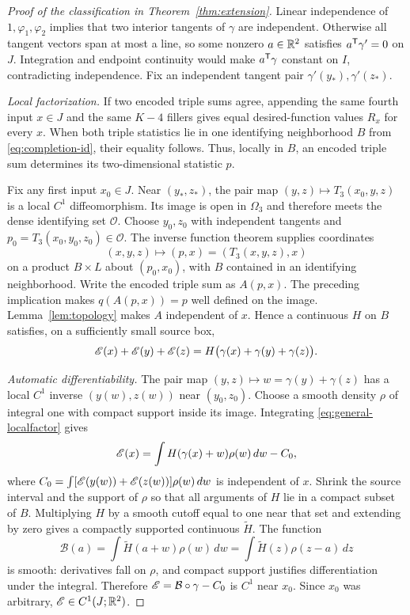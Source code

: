 \begin{proof}[Proof of the classification in Theorem~\ref{thm:extension}]
Linear independence of $1,\varphi_1,\varphi_2$ implies that two interior tangents of $\gamma$ are independent. Otherwise all tangent vectors span at most a line, so some nonzero $a\in\mathbb R^2$ satisfies $a^\mathsf T\gamma'=0$ on $J$. Integration and endpoint continuity would make $a^\mathsf T\gamma$ constant on $I$, contradicting independence. Fix an independent tangent pair $\gamma'(y_*),\gamma'(z_*)$.

\emph{Local factorization.} If two encoded triple sums agree, appending the same fourth input $x\in J$ and the same $K-4$ fillers gives equal desired-function values $R_x$ for every $x$. When both triple statistics lie in one identifying neighborhood $B$ from \eqref{eq:completion-id}, their equality follows. Thus, locally in $B$, an encoded triple sum determines its two-dimensional statistic $p$.

Fix any first input $x_0\in J$. Near $(y_*,z_*)$, the pair map $(y,z)\mapsto T_3(x_0,y,z)$ is a local $C^1$ diffeomorphism. Its image is open in $\Omega_3$ and therefore meets the dense identifying set $\mathcal O$. Choose $y_0,z_0$ with independent tangents and $p_0=T_3(x_0,y_0,z_0)\in\mathcal O$. The inverse function theorem supplies coordinates
$$
 (x,y,z)\longmapsto(p,x)=(T_3(x,y,z),x)
$$
on a product $B\times L$ about $(p_0,x_0)$, with $B$ contained in an identifying neighborhood. Write the encoded triple sum as $A(p,x)$. The preceding implication makes $q(A(p,x))=p$ well defined on the image. Lemma~\ref{lem:topology} makes $A$ independent of $x$. Hence a continuous $H$ on $B$ satisfies, on a sufficiently small source box,
\begin{equation}
 \mathscr E(x)+\mathscr E(y)+\mathscr E(z)
 =H\bigl(\gamma(x)+\gamma(y)+\gamma(z)\bigr).
 \label{eq:general-localfactor}
\end{equation}

\emph{Automatic differentiability.} The pair map $(y,z)\mapsto w=\gamma(y)+\gamma(z)$ has a local $C^1$ inverse $(y(w),z(w))$ near $(y_0,z_0)$. Choose a smooth density $\rho$ of integral one with compact support inside its image. Integrating \eqref{eq:general-localfactor} gives
$$
 \mathscr E(x)=\int H(\gamma(x)+w)\rho(w)\,dw-C_0,
$$
where $C_0=\int[\mathscr E(y(w))+\mathscr E(z(w))]\rho(w)\,dw$ is independent of $x$. Shrink the source interval and the support of $\rho$ so that all arguments of $H$ lie in a compact subset of $B$. Multiplying $H$ by a smooth cutoff equal to one near that set and extending by zero gives a compactly supported continuous $\widetilde H$. The function
$$
 \mathcal B(a)=\int\widetilde H(a+w)\rho(w)\,dw
             =\int\widetilde H(z)\rho(z-a)\,dz
$$
is smooth: derivatives fall on $\rho$, and compact support justifies differentiation under the integral. Therefore $\mathscr E=\mathcal B\circ\gamma-C_0$ is $C^1$ near $x_0$. Since $x_0$ was arbitrary, $\mathscr E\in C^1(J;\mathbb R^2)$.


\end{proof}
